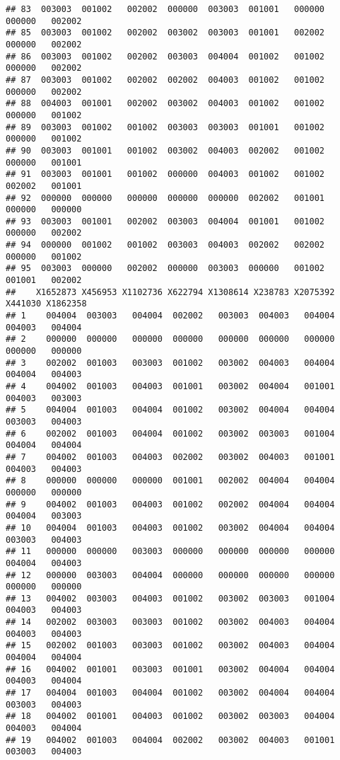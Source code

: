 \documentclass[
]{article}
\begin{document}
\begin{verbatim}
## 83  003003  001002   002002  000000  003003  001001   000000   000000   002002
## 85  003003  001002   002002  003002  003003  001001   002002   000000   002002
## 86  003003  001002   002002  003003  004004  001002   001002   000000   002002
## 87  003003  001002   002002  002002  004003  001002   001002   000000   002002
## 88  004003  001001   002002  003002  004003  001002   001002   000000   001002
## 89  003003  001002   001002  003003  003003  001001   001002   000000   001002
## 90  003003  001001   001002  003002  004003  002002   001002   000000   001001
## 91  003003  001001   001002  000000  004003  001002   001002   002002   001001
## 92  000000  000000   000000  000000  000000  002002   001001   000000   000000
## 93  003003  001001   002002  003003  004004  001001   001002   000000   002002
## 94  000000  001002   001002  003003  004003  002002   002002   000000   001002
## 95  003003  000000   002002  000000  003003  000000   001002   001001   002002
##    X1652873 X456953 X1102736 X622794 X1308614 X238783 X2075392 X441030 X1862358
## 1    004004  003003   004004  002002   003003  004003   004004  004003   004004
## 2    000000  000000   000000  000000   000000  000000   000000  000000   000000
## 3    002002  001003   003003  001002   003002  004003   004004  004004   004003
## 4    004002  001003   004003  001001   003002  004004   001001  004003   003003
## 5    004004  001003   004004  001002   003002  004004   004004  003003   004003
## 6    002002  001003   004004  001002   003002  003003   001004  004004   004004
## 7    004002  001003   004003  002002   003002  004003   001001  004003   004003
## 8    000000  000000   000000  001001   002002  004004   004004  000000   000000
## 9    004002  001003   004003  001002   002002  004004   004004  004004   003003
## 10   004004  001003   004003  001002   003002  004004   004004  003003   004003
## 11   000000  000000   003003  000000   000000  000000   000000  004004   004003
## 12   000000  003003   004004  000000   000000  000000   000000  000000   000000
## 13   004002  003003   004003  001002   003002  003003   001004  004003   004003
## 14   002002  003003   003003  001002   003002  004003   004004  004003   004003
## 15   002002  001003   003003  001002   003002  004003   004004  004004   004004
## 16   004002  001001   003003  001001   003002  004004   004004  004003   004004
## 17   004004  001003   004004  001002   003002  004004   004004  003003   004003
## 18   004002  001001   004003  001002   003002  003003   004004  004003   004004
## 19   004002  001003   004004  002002   003002  004003   001001  003003   004003

\end{verbatim}
\end{document}
